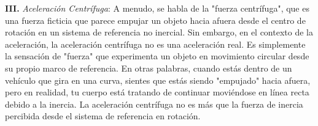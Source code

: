 \documentclass{article}
\begin{document}
\noindent \textbf{III.} \textit{Aceleración Centrífuga}: A menudo, se habla de la "fuerza centrífuga", que es una fuerza ficticia que parece empujar un objeto hacia afuera desde el centro de rotación en un sistema de referencia no inercial. Sin embargo, en el contexto de la aceleración, la aceleración centrífuga no es una aceleración real. Es simplemente la sensación de "fuerza" que experimenta un objeto en movimiento circular desde su propio marco de referencia. En otras palabras, cuando estás dentro de un vehículo que gira en una curva, sientes que estás siendo "empujado" hacia afuera, pero en realidad, tu cuerpo está tratando de continuar moviéndose en línea recta debido a la inercia. La aceleración centrífuga no es más que la fuerza de inercia percibida desde el sistema de referencia en rotación.\\\\
\end{document}

